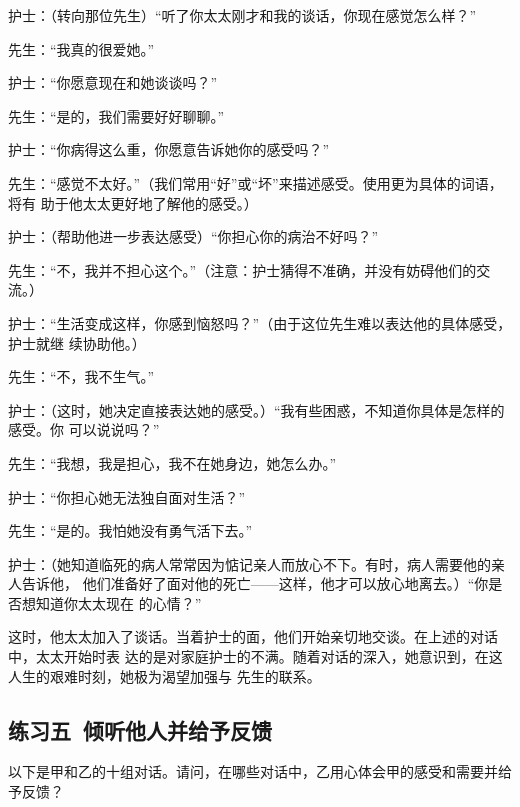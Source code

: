 \documentclass{ctexart}
\renewenvironment{quotation}{\setlength{\parskip}{0.5em}\setstretch{1.5}\kaishu\zihao{-5}\setlength{\parindent}{1em}}{\vspace{1em}}
\begin{document}
\begin{quotation}
	护士：（转向那位先生）``听了你太太刚才和我的谈话，你现在感觉怎么样？''

	先生：``我真的很爱她。''

	护士：``你愿意现在和她谈谈吗？''

	先生：``是的，我们需要好好聊聊。''

	护士：``你病得这么重，你愿意告诉她你的感受吗？''

	先生：``感觉不太好。''（我们常用``好''或``坏''来描述感受。使用更为具体的词语，将有
	助于他太太更好地了解他的感受。）

	护士：（帮助他进一步表达感受）``你担心你的病治不好吗？''

	先生：``不，我并不担心这个。''（注意：护士猜得不准确，并没有妨碍他们的交流。）

	护士：``生活变成这样，你感到恼怒吗？''（由于这位先生难以表达他的具体感受，护士就继
	续协助他。）

	先生：``不，我不生气。''

	护士：（这时，她决定直接表达她的感受。）``我有些困惑，不知道你具体是怎样的感受。你
	可以说说吗？''

	先生：``我想，我是担心，我不在她身边，她怎么办。''

	护士：``你担心她无法独自面对生活？''

	先生：``是的。我怕她没有勇气活下去。''

	护士：（她知道临死的病人常常因为惦记亲人而放心不下。有时，病人需要他的亲人告诉他，
	他们准备好了面对他的死亡------这样，他才可以放心地离去。）``你是否想知道你太太现在
	的心情？''
\end{quotation}

这时，他太太加入了谈话。当着护士的面，他们开始亲切地交谈。在上述的对话中，太太开始时表
达的是对家庭护士的不满。随着对话的深入，她意识到，在这人生的艰难时刻，她极为渴望加强与
先生的联系。


\subsection{练习五\ 倾听他人并给予反馈}

以下是甲和乙的十组对话。请问，在哪些对话中，乙用心体会甲的感受和需要并给予反馈？
\end{document}
